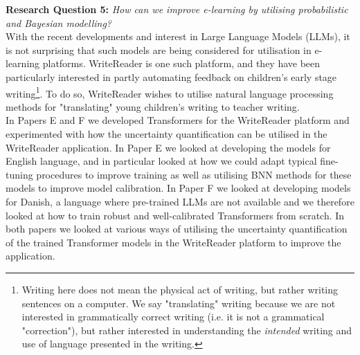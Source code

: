 \noindent \textbf{Research Question 5:} \textit{How can we improve e-learning by utilising probabilistic and Bayesian modelling?}\\

\noindent With the recent developments and interest in Large Language Models (LLMs), it is not surprising that such models are being considered for utilisation in e-learning platforms. WriteReader is one such platform, and they have been particularly interested in partly automating feedback on children's early stage writing\footnote{Writing here does not mean the physical act of writing, but rather writing sentences on a computer. We say "translating" writing because we are not interested in grammatically correct writing (i.e. it is not a grammatical "correction"), but rather interested in understanding the \textit{intended} writing and use of language presented in the writing.}. To do so, WriteReader wishes to utilise natural language processing methods for "translating" young children's writing to teacher writing. \\

\noindent In Papers E and F we developed Transformers \citep{NIPS2017_3f5ee243} for the WriteReader platform and experimented with how the uncertainty quantification can be utilised in the WriteReader application. In Paper E we looked at developing the models for English language, and in particular looked at how we could adapt typical fine-tuning procedures to improve training as well as utilising BNN methods for these models to improve model calibration. In Paper F we looked at developing models for Danish, a language where pre-trained LLMs are not available and we therefore looked at how to train robust and well-calibrated Transformers from scratch. In both papers we looked at various ways of utilising the uncertainty quantification of the trained Transformer models in the WriteReader platform to improve the application.











